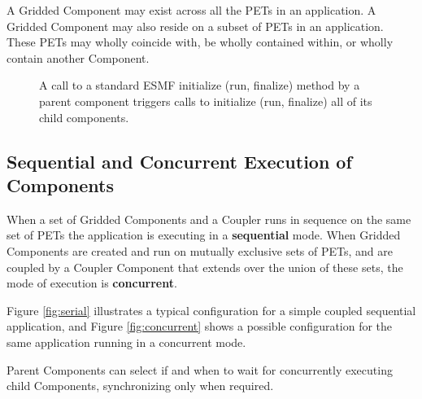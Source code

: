 A Gridded Component may exist across all the PETs in an application. 
A Gridded Component may also reside on a subset of PETs in an
application.  These PETs may wholly coincide with, be wholly contained
within, or wholly contain another Component.

\begin{center}
\begin{figure}
\caption{A call to a standard ESMF initialize (run, finalize) method
by a parent component triggers calls to initialize (run, finalize)
all of its child components.}
\label{fig:appunit}
\end{figure}
\end{center}

\subsection{Sequential and Concurrent Execution of Components}
\label{sec:concurrency}

When a set of Gridded Components and a Coupler runs in sequence
on the same set of PETs the application is executing in a {\bf sequential}
mode. When Gridded Components are created and run on mutually exclusive
sets of PETs, and are coupled by a Coupler Component that extends over
the union of these sets, the mode of execution is {\bf concurrent}.

Figure \ref{fig:serial} illustrates a typical configuration for 
a simple coupled sequential
application, and Figure \ref{fig:concurrent} shows a possible 
configuration for the same application running in a concurrent mode.

Parent Components can select if and when to wait for concurrently
executing child Components, synchronizing only when required.

